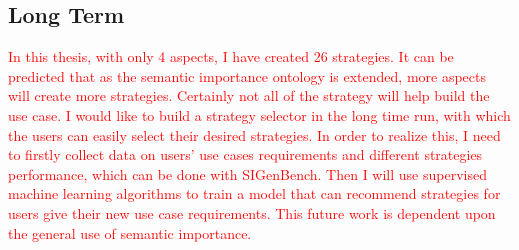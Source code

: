 \subsection{Long Term}
\textcolor{red}{
In this thesis, with only 4 aspects, I have created 26 strategies.
It can be predicted that as the semantic importance ontology is extended, more aspects will create more strategies. 
Certainly not all of the strategy will help build the use case. 
I would like to build a strategy selector in the long time run, with which the users can easily select their desired strategies. 
In order to realize this, I need to firstly collect data on users' use cases requirements and different strategies performance, which can be done with SIGenBench.
Then I will use supervised machine learning algorithms to train a model that can recommend strategies for users give their new use case requirements. 
This future work is dependent upon the general use of semantic importance. 
}


